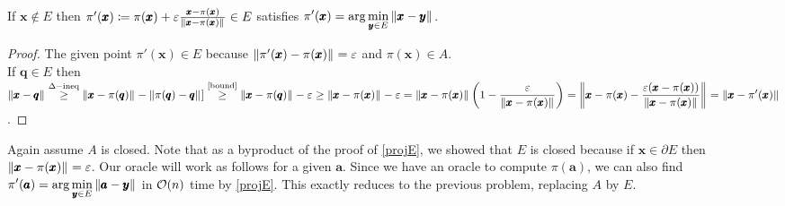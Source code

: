 \begin{enumerate}[label=(\alph*)]
\begin{cl}\label{projE}
If $\pmb x\notin E$ then $\pi'(\pmb x)\coloneqq \pi(\pmb x) + \varepsilon\frac{\pmb x-\pi(\pmb x)}{\left\lVert \pmb x-\pi(\pmb x) \right\rVert_{}}\in E$ satisfies $\displaystyle\pi'(\pmb x) = \arg\min_{\pmb y\in E}\left\lVert \pmb x-\pmb y \right\rVert_{}$.
\end{cl}
\begin{proof}
The given point $\pi'(\pmb x)\in E$ because $\left\lVert \pi'(\pmb x)-\pi(\pmb x) \right\rVert_{}=\varepsilon$ and $\pi(\pmb x)\in A$.\\
If $\pmb q\in E$ then $\ds\norm{\pmb x-\pmb q}{} \stackrel{\Delta-\text{ineq}}{\ge} \norm{\pmb x-\pi(\pmb q)}{} - \norm{\pi(\pmb q)-\pmb q}{} ]\stackrel{\text{\Cref{bound}}}{\ge} \norm{\pmb x-\pi(\pmb q)}{} - \epsilon \ge \norm{\pmb x-\pi(\pmb x)}{} - \epsilon = \norm{\pmb x-\pi(\pmb x)}{} \left(1-\frac{\epsilon}{\norm{\pmb x-\pi(\pmb x)}{}}\right) 
= \norm{\pmb x-\pi(\pmb x) - \frac{\epsilon(\pmb x-\pi(\pmb x))}{\norm{\pmb x-\pi(\pmb x)}{}}}{} = \norm{\pmb x-\pi'(\pmb x)}{}$.
\end{proof}


Again assume $A$ is closed. Note that as a byproduct of the proof of \cref{projE}, we showed that $E$ is closed because if $\pmb x\in \partial E$ then $\left\lVert \pmb x-\pi(\pmb x) \right\rVert_{} = \varepsilon$. Our oracle will work as follows for a given $\pmb a$. Since we have an oracle to compute $\pi(\pmb a)$, we can also find $\displaystyle\pi'(\pmb a) = \arg\min_{\pmb y\in E}\left\lVert \pmb a-\pmb y \right\rVert_{}$ in ${\mathcal{O}}(n)$ time by \cref{projE}. This exactly reduces to the previous problem, replacing $A$ by $E$.


\end{enumerate}








